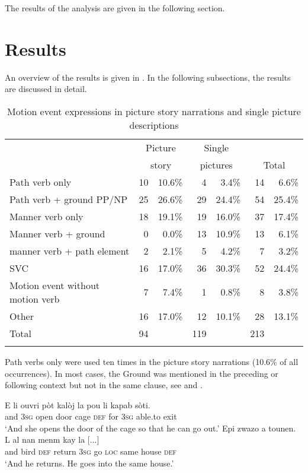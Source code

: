 \documentclass[output=paper,colorlinks,citecolor=brown]{langscibook}
\begin{document}
The results of the analysis are given in the following section.


\section{Results}\label{sec:3:4}

An overview of the results is given in . In the following subsections, the results are discussed in detail.

\begin{table}
\begin{tabular}{l rr rr rr}
\lsptoprule
                 & \multicolumn{2}{c}{Picture} & \multicolumn{2}{c}{Single} & \\
                 & \multicolumn{2}{c}{story}   & \multicolumn{2}{c}{pictures} &\multicolumn{2}{c}{Total} \\\midrule
{Path verb only} &  10     & 10.6\% & 4      & 3.4\%  & 14     & 6.6\% \\
{Path verb + ground PP/NP} &  25       & 26.6\%   & 29       & 24.4\%   & 54       & 25.4\%  \\
{Manner verb only} & 18      & 19.1\%  & 19      & 16.0\%    & 37      & 17.4\% \\
{Manner verb + ground} &  0      & 0.0\%      & 13     & 10.9\% & 13     & 6.1\% \\
{manner verb + path element} &    2     &  2.1\% &  5     &  4.2\% &  7     &  3.2\%\\
{SVC} &  16     & 17.0\%   & 36     & 30.3\% & 52     & 24.4\%\\
{Motion event without motion verb} &   7      &  7.4\%  &  1      &  0.8\%  &  8      &  3.8\% \\
{Other} &   16      & 17.0\%    & 12      & 10.1\%  & 28      & 13.1\% \\
\midrule
{Total} &  94 & & 119 & & 213 & \\
\lspbottomrule
\end{tabular}
\caption{Motion event expressions in picture story narrations and single picture descriptions}
\label{tab:tab2_03}
\end{table}

Path verbs only were used ten times in the picture story narrations (10.6\% of all occurrences). In most cases, the Ground was mentioned in the preceding or following context but not in the same clause, see  and .

\ea \label{ex:3:32}
\gll E li ouvri pòt kalòj la pou li kapab sòti.\\
     and \textsc{3sg} open door cage \textsc{def} for \textsc{3sg} able.to exit\\
\glt ‘And she opens the door of the cage so that he can go out.’
\ex \label{ex:3:33}
\gll Epi zwazo a tounen. L al nan menm kay la {[}...{]}\\
     and bird \textsc{def} return \textsc{3sg} go \textsc{loc} same house \textsc{def}\\
\glt ‘And he returns. He goes into the same house.’
\z
\end{document}
